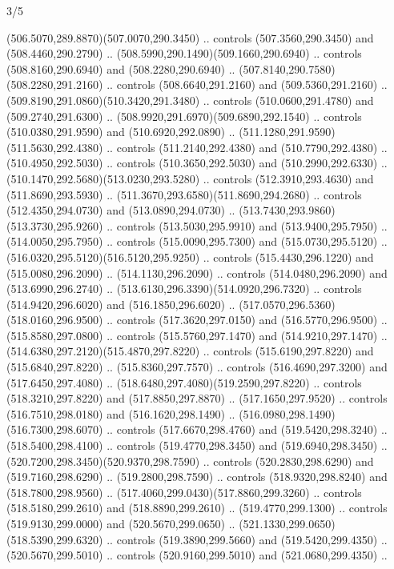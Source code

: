 \begin{flagdescription}{3/5}
\begin{scope}[shift={(0.5\flaglength,0.5\flagwidth)},scale=\flagwidth/1075]
\begin{scope}[y=0.80pt, x=0.80pt, yscale=-2.37, xscale=2.37,xshift=-402,yshift=-230.4]
  (506.5070,289.8870)(507.0070,290.3450) .. controls (507.3560,290.3450) and
  (508.4460,290.2790) .. (508.5990,290.1490)(509.1660,290.6940) .. controls
  (508.8160,290.6940) and (508.2280,290.6940) ..
  (507.8140,290.7580)(508.2280,291.2160) .. controls (508.6640,291.2160) and
  (509.5360,291.2160) .. (509.8190,291.0860)(510.3420,291.3480) .. controls
  (510.0600,291.4780) and (509.2740,291.6300) ..
  (508.9920,291.6970)(509.6890,292.1540) .. controls (510.0380,291.9590) and
  (510.6920,292.0890) .. (511.1280,291.9590)(511.5630,292.4380) .. controls
  (511.2140,292.4380) and (510.7790,292.4380) .. (510.4950,292.5030) .. controls
  (510.3650,292.5030) and (510.2990,292.6330) ..
  (510.1470,292.5680)(513.0230,293.5280) .. controls (512.3910,293.4630) and
  (511.8690,293.5930) .. (511.3670,293.6580)(511.8690,294.2680) .. controls
  (512.4350,294.0730) and (513.0890,294.0730) ..
  (513.7430,293.9860)(513.3730,295.9260) .. controls (513.5030,295.9910) and
  (513.9400,295.7950) .. (514.0050,295.7950) .. controls (515.0090,295.7300) and
  (515.0730,295.5120) .. (516.0320,295.5120)(516.5120,295.9250) .. controls
  (515.4430,296.1220) and (515.0080,296.2090) .. (514.1130,296.2090) .. controls
  (514.0480,296.2090) and (513.6990,296.2740) ..
  (513.6130,296.3390)(514.0920,296.7320) .. controls (514.9420,296.6020) and
  (516.1850,296.6020) .. (517.0570,296.5360)(518.0160,296.9500) .. controls
  (517.3620,297.0150) and (516.5770,296.9500) .. (515.8580,297.0800) .. controls
  (515.5760,297.1470) and (514.9210,297.1470) ..
  (514.6380,297.2120)(515.4870,297.8220) .. controls (515.6190,297.8220) and
  (515.6840,297.8220) .. (515.8360,297.7570) .. controls (516.4690,297.3200) and
  (517.6450,297.4080) .. (518.6480,297.4080)(519.2590,297.8220) .. controls
  (518.3210,297.8220) and (517.8850,297.8870) .. (517.1650,297.9520) .. controls
  (516.7510,298.0180) and (516.1620,298.1490) ..
  (516.0980,298.1490)(516.7300,298.6070) .. controls (517.6670,298.4760) and
  (519.5420,298.3240) .. (518.5400,298.4100) .. controls (519.4770,298.3450) and
  (519.6940,298.3450) .. (520.7200,298.3450)(520.9370,298.7590) .. controls
  (520.2830,298.6290) and (519.7160,298.6290) .. (519.2800,298.7590) .. controls
  (518.9320,298.8240) and (518.7800,298.9560) ..
  (517.4060,299.0430)(517.8860,299.3260) .. controls (518.5180,299.2610) and
  (518.8890,299.2610) .. (519.4770,299.1300) .. controls (519.9130,299.0000) and
  (520.5670,299.0650) .. (521.1330,299.0650)(518.5390,299.6320) .. controls
  (519.3890,299.5660) and (519.5420,299.4350) .. (520.5670,299.5010) .. controls
  (520.9160,299.5010) and (521.0680,299.4350) ..

\end{scope}
\end{scope}
\end{flagdescription}
